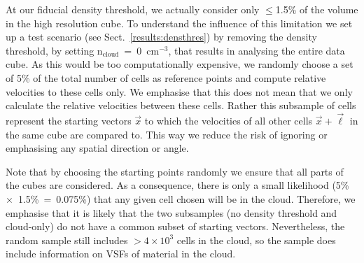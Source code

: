 At our fiducial density threshold, we actually consider only $\leq$1.5\% of the volume in the high resolution cube.
To understand the influence of this limitation we set up a test scenario (see Sect.~\ref{results:densthres}) by removing the density threshold, by setting n$_\mathrm{cloud}$~=~0~cm$^{-3}$, that results in analysing the entire data cube.
As this would be too computationally expensive, we randomly choose a set of 5\% of the total number of cells as reference points and compute relative velocities to these cells only.
We emphasise that this does not mean that we only calculate the relative velocities between these cells.
Rather this subsample of cells represent the starting vectors $\vec{x}$ to which the velocities of all other cells $\vec{x} + \vec{\ell}$ in the same cube are compared to.
This way we reduce the risk of ignoring or emphasising any spatial direction or angle.

Note that by choosing the starting points randomly we ensure that all parts of the cubes are considered. 
As a consequence, there is only a small likelihood (5\%~$\times$~1.5\%~=~0.075\%) that any given cell chosen will be in the cloud.
Therefore, we emphasise that it is likely that the two subsamples (no density threshold and cloud-only) do not have a common subset of starting vectors.
Nevertheless, the random sample still includes $>4 \times 10^3$ cells in the cloud, so the sample does include information on VSFs of material in the cloud.

\endinput
